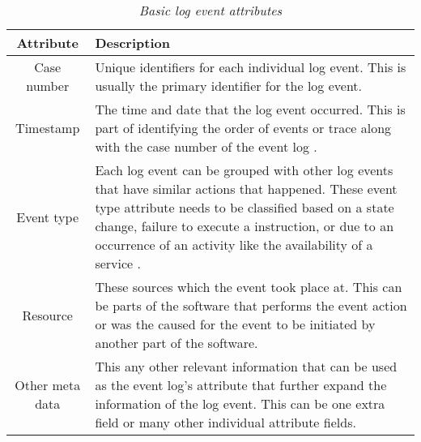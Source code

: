 \begin{table}[!htb]
	\centering
	\small
	\caption[Basic log event attributes]
	{\textit{Basic log event attributes \cite{Bekeneva2020}}}
	\label{tbl:CH1_Log_Basic_Attributes}
	\begin{tabularx}{\textwidth}{|c|X|}
		\hline \textbf{Attribute} & \textbf{Description} \\
		\hline Case number & Unique identifiers for each individual log event. This is usually the primary identifier for the log event. \\
		\hline Timestamp & The time and date that the log event occurred. This is part of identifying the order of events or trace along with the case number of the event log \cite{Kherbouche2017}. \\
		\hline Event type & Each log event can be grouped with other log events that have similar actions that happened. These event type attribute needs to be classified based on a state change, failure to execute a instruction, or due to an occurrence of an activity like the availability of a service \cite{Fedaghi2010}. \\
		\hline Resource & These sources which the event took place at. This can be parts of the software that performs the event action or was the caused for the event to be initiated by another part of the software. \\
		\hline Other meta data & This any other relevant information that can be used as the event log's attribute that further expand the information of the log event. This can be one extra field or many other individual attribute fields.\\
		\hline
	\end{tabularx}
\end{table}

